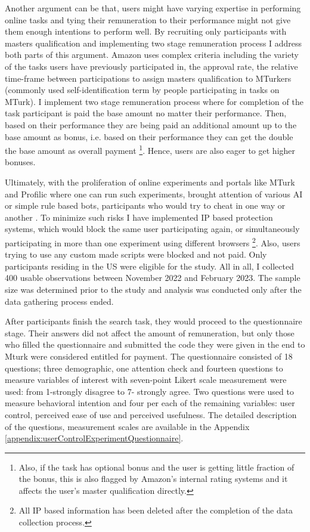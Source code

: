 \documentclass[a4paper,12pt]{article}
\begin{document}
Another argument can be that, users might have varying expertise in performing online tasks and tying their remuneration to their performance might not give them enough intentions to perform well. By recruiting only participants with masters qualification and implementing two stage remuneration process I address both parts of this argument.
Amazon uses complex criteria including the variety of the tasks users have previously participated in, the approval rate, the relative time-frame between participations to assign masters qualification to MTurkers (commonly used self-identification term by people participating in tasks on MTurk). I implement two stage remuneration process where for completion of the task participant is paid the base amount no matter their performance. Then, based on their performance they are being paid an additional amount up to the base amount as bonus, i.e. based on their performance they can get the double the base amount as overall payment \footnote{Also, if the task has optional bonus and the user is getting little fraction of the bonus, this is also flagged by Amazon's internal rating systems and it affects the user's master qualification directly.}. Hence, users are also eager to get higher bonuses.

Ultimately, with the proliferation of online experiments and portals like MTurk and Profilic where one can run such experiments, brought attention of various AI or simple rule based bots, participants who would try to cheat in one way or another \citep{aguinis2020mturk}. To minimize such risks I have implemented IP based protection systems, which would block the same user participating again, or simultaneously participating in more than one experiment using different browsers \footnote{All IP based information has been deleted after the completion of the data collection process.}. Also, users trying to use any custom made scripts were blocked and not paid. Only participants residing in the US were eligible for the study. All in all, I collected 400 usable observations between November 2022 and February 2023. The sample size was determined prior to the study and analysis was conducted only after the data gathering process ended.

After participants finish the search task, they would proceed to the questionnaire stage. Their answers did not affect the amount of remuneration, but only those who filled the questionnaire and submitted the code they were given in the end to Mturk were considered entitled for payment.  The questionnaire consisted of 18 questions; three demographic, one attention check and fourteen questions to measure variables of interest with seven-point Likert scale measurement were used: from 1-strongly disagree to 7- strongly agree. Two questions were used to measure behavioral intention and four per each of the remaining variables: user control, perceived ease of use and perceived usefulness. The detailed description of the questions, measurement scales are available in the Appendix \ref{appendix:userControlExperimentQuestionnaire}. %
\end{document}
